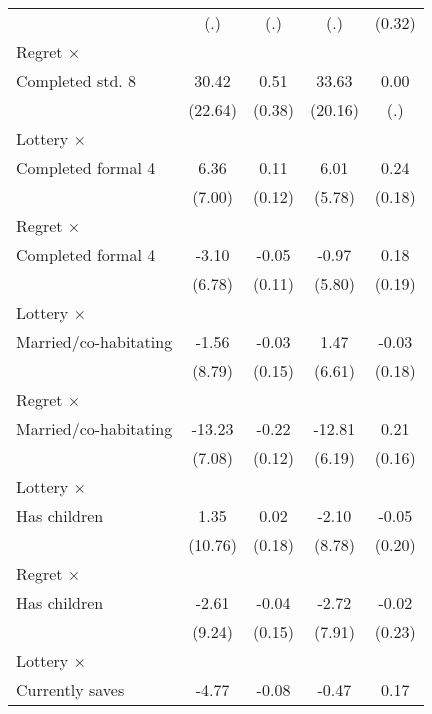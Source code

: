 \begin{table}[htbp]
\begin{tabular}{l*{4}{c}}
                &      (.)         &      (.)         &      (.)         &   (0.32)         \\
\addlinespace
Regret $\times$ \\ Completed std. 8&    30.42         &     0.51         &    33.63\sym{*}  &     0.00         \\
                &  (22.64)         &   (0.38)         &  (20.16)         &      (.)         \\
\addlinespace
Lottery $\times$ \\ Completed formal 4&     6.36         &     0.11         &     6.01         &     0.24         \\
                &   (7.00)         &   (0.12)         &   (5.78)         &   (0.18)         \\
\addlinespace
Regret $\times$ \\ Completed formal 4&    -3.10         &    -0.05         &    -0.97         &     0.18         \\
                &   (6.78)         &   (0.11)         &   (5.80)         &   (0.19)         \\
\addlinespace
Lottery $\times$ \\ Married/co-habitating&    -1.56         &    -0.03         &     1.47         &    -0.03         \\
                &   (8.79)         &   (0.15)         &   (6.61)         &   (0.18)         \\
\addlinespace
Regret $\times$ \\ Married/co-habitating&   -13.23\sym{*}  &    -0.22\sym{*}  &   -12.81\sym{**} &     0.21         \\
                &   (7.08)         &   (0.12)         &   (6.19)         &   (0.16)         \\
\addlinespace
Lottery $\times$ \\ Has children&     1.35         &     0.02         &    -2.10         &    -0.05         \\
                &  (10.76)         &   (0.18)         &   (8.78)         &   (0.20)         \\
\addlinespace
Regret $\times$ \\ Has children&    -2.61         &    -0.04         &    -2.72         &    -0.02         \\
                &   (9.24)         &   (0.15)         &   (7.91)         &   (0.23)         \\
\addlinespace
Lottery $\times$ \\ Currently saves&    -4.77         &    -0.08         &    -0.47         &     0.17         \\

\end{tabular}
\end{table}
